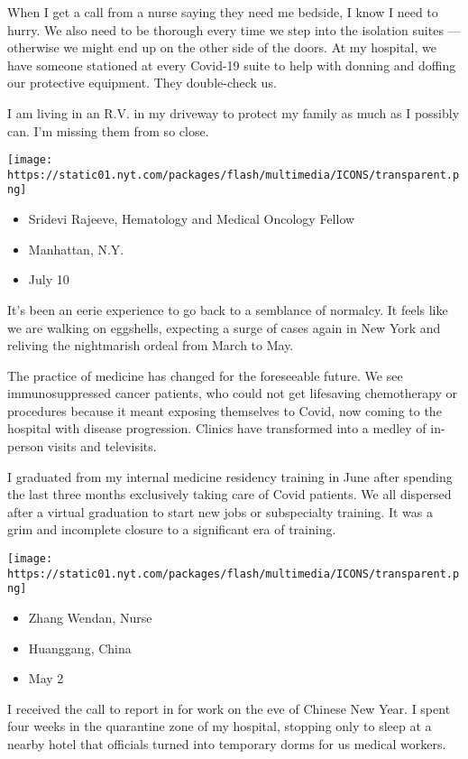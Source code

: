 When I get a call from a nurse saying they need me bedside, I know I
need to hurry. We also need to be thorough every time we step into the
isolation suites --- otherwise we might end up on the other side of the
doors. At my hospital, we have someone stationed at every Covid-19 suite
to help with donning and doffing our protective equipment. They
double-check us.

I am living in an R.V. in my driveway to protect my family as much as I
possibly can. I'm missing them from so close.

\texttt{[image: https://static01.nyt.com/packages/flash/multimedia/ICONS/transparent.png]}

\begin{itemize}
\tightlist
\item
  Sridevi Rajeeve, Hematology and Medical Oncology Fellow
\item
  Manhattan, N.Y.
\item
  July 10
\end{itemize}

It's been an eerie experience to go back to a semblance of normalcy. It
feels like we are walking on eggshells, expecting a surge of cases again
in New York and reliving the nightmarish ordeal from March to May.

The practice of medicine has changed for the foreseeable future. We see
immunosuppressed cancer patients, who could not get lifesaving
chemotherapy or procedures because it meant exposing themselves to
Covid, now coming to the hospital with disease progression. Clinics have
transformed into a medley of in-person visits and televisits.

I graduated from my internal medicine residency training in June after
spending the last three months exclusively taking care of Covid
patients. We all dispersed after a virtual graduation to start new jobs
or subspecialty training. It was a grim and incomplete closure to a
significant era of training.

\texttt{[image: https://static01.nyt.com/packages/flash/multimedia/ICONS/transparent.png]}

\begin{itemize}
\tightlist
\item
  Zhang Wendan, Nurse
\item
  Huanggang, China
\item
  May 2
\end{itemize}

I received the call to report in for work on the eve of Chinese New
Year. I spent four weeks in the quarantine zone of my hospital, stopping
only to sleep at a nearby hotel that officials turned into temporary
dorms for us medical workers.

